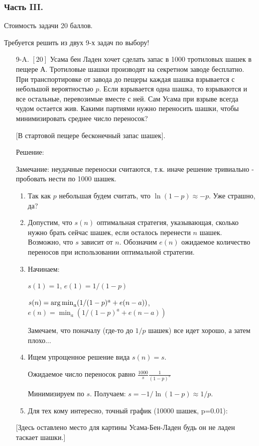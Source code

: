 \documentclass[12pt, a4paper]{article}\usepackage[]{graphicx}\usepackage[]{color}
\begin{document}
\subsubsection*{Часть III.}

Стоимость задачи 20 баллов.

Требуется решить \textbf{} из двух 9-х задач по
выбору!

\begin{enumerate}
\item[9-A.] $[20]$  Усама бен Ладен хочет сделать запас в 1000 тротиловых шашек в пещере А. Тротиловые шашки производят на секретном заводе бесплатно. При транспортировке от завода до пещеры каждая шашка взрывается с небольшой вероятностью $p$. Если взрывается одна шашка, то взрываются и все остальные, перевозимые вместе с ней. Сам Усама при взрыве всегда чудом остается жив. Какими партиями нужно переносить шашки, чтобы минимизировать среднее число переносок?

$[$В стартовой пещере бесконечный запас шашек$]$.

Решение:

Замечание: неудачные переноски считаются, т.к. иначе решение тривиально - пробовать нести по 1000 шашек.
\begin{enumerate}
\item  Так как $p$ небольшая будем считать, что $\ln(1-p)\approx -p$. Уже страшно, да?
\item Допустим, что $s(n)$ оптимальная стратегия, указывающая, сколько нужно брать сейчас шашек, если осталось перенести $n$ шашек. Возможно, что $s$ зависит от $n$.
Обозначим $e(n)$ ожидаемое количество переносов при использовании оптимальной стратегии.
\item Начинаем:

$s(1)=1$, $e(1)=1/(1-p)$

$s(n)=\operatorname*{arg\,min}_{a}(1/(1-p)^{a}+e(n-a))$, $e(n)=\min_{a}(1/(1-p)^{a}+e(n-a))$

Замечаем, что поначалу (где-то до $1/p$ шашек) все идет хорошо, а затем плохо...
\item Ищем упрощенное решение вида $s(n)=s$.

Ожидаемое число переносок равно $\frac{1000}{s}\frac{1}{(1-p)^{s}}$

Минимизируем по $s$. Получаем: $s=-1/\ln(1-p)\approx 1/p$.
\item Для тех кому интересно, точный график (10000 шашек, p=0.01):
\end{enumerate}
$[$Здесь оставлено место для картины Усама-Бен-Ладен будь он не ладен таскает шашки.$]$


\end{enumerate}
\end{document}
